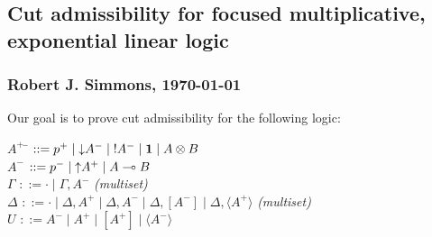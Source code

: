 \documentclass[12pt]{article}
\begin{document}
\subsection*{Cut admissibility for focused multiplicative, exponential linear logic}
\subsubsection*{Robert J. Simmons, \today}

Our goal is to prove cut admissibility for the following logic:

\begin{tabbing}
\quad $A^+$ \= $::= p^+ 
              \mid {\downarrow}A^- 
              \mid {!}A^- 
              \mid \mathbf{1}
              \mid A \otimes B$\\
\quad $A^-$ \> $::= p^-
              \mid {\uparrow}A^+
              \mid A \multimap B$\\
\quad $\Gamma$ \> $::= \cdot \mid \Gamma, A^-$ \qquad\qquad\qquad\qquad\qquad\qquad\quad \= {\it (multiset)}\\
\quad $\Delta$ \> $::= \cdot \mid \Delta, A^+ \mid \Delta, A^- \mid \Delta, [A^-] \mid \Delta, \langle A^+ \rangle$ \> {\it (multiset)}\\
\quad $U$ \> $::= A^- \mid A^+ \mid [ A^+ ] \mid \langle A^- \rangle$
\end{tabbing}
%
%
\end{document}
